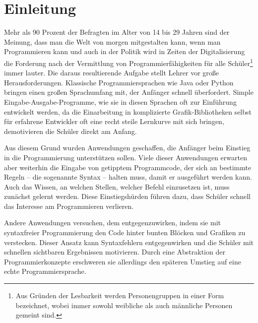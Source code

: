 \chapter{Einleitung}
\label{sec:intro}


Mehr als 90 Prozent der Befragten im Alter von 14 bis 29 Jahren sind der Meinung, dass man die Welt von morgen mitgestalten kann, wenn man Programmieren kann  und auch in der Politik wird in Zeiten der Digitalisierung die Forderung nach der Vermittlung von Programmierfähigkeiten für alle Schüler\footnote{Aus Gründen der Lesbarkeit werden Personengruppen in einer Form bezeichnet, wobei immer sowohl weibliche als auch männliche Personen gemeint sind.} immer lauter. Die daraus resultierende Aufgabe stellt Lehrer vor große Herausforderungen. Klassische Programmiersprachen wie Java oder Python bringen einen großen Sprachumfang mit, der Anfänger schnell überfordert. Simple Eingabe-Ausgabe-Programme, wie sie in diesen Sprachen oft zur Einführung entwickelt werden, da die Einarbeitung in komplizierte Grafik-Bibliotheken selbst für erfahrene Entwickler oft eine recht steile Lernkurve mit sich bringen, demotivieren die Schüler direkt am Anfang.

Aus diesem Grund wurden Anwendungen geschaffen, die Anfänger beim Einstieg in die Programmierung unterstützen sollen. Viele dieser Anwendungen erwarten aber weiterhin die Eingabe von getipptem Programmcode, der sich an bestimmte Regeln -- die sogenannte Syntax -- halten muss, damit er ausgeführt werden kann. Auch das Wissen, an welchen Stellen, welcher Befehl einzusetzen ist, muss zunächst gelernt werden. Diese Einstiegshürden führen dazu, dass Schüler schnell das Interesse am Programmieren verlieren.

Andere Anwendungen versuchen, dem entgegenzuwirken, indem sie mit syntaxfreier Programmierung den Code hinter bunten Blöcken und Grafiken zu verstecken. Dieser Ansatz kann Syntaxfehlern entgegenwirken und die Schüler mit schnellen sichtbaren Ergebnissen motivieren. Durch eine Abstraktion der Programmierkonzepte erschweren sie allerdings den späteren Umstieg auf eine echte Programmiersprache.


